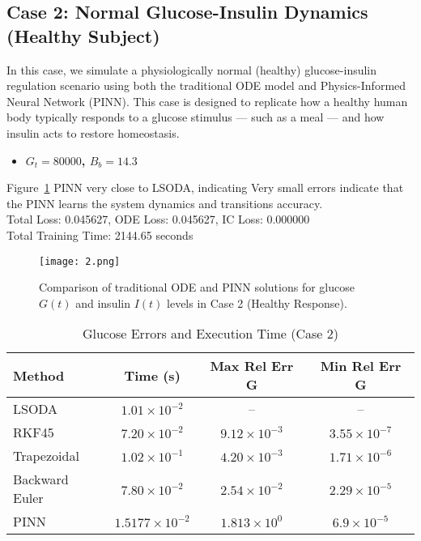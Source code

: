 \documentclass[conference]{IEEEtran}
\begin{document}
\subsection{Case 2: Normal Glucose-Insulin Dynamics (Healthy Subject)}

In this case, we simulate a physiologically normal (healthy) glucose-insulin regulation scenario using both the traditional ODE model and Physics-Informed Neural Network (PINN). This case is designed to replicate how a healthy human body typically responds to a glucose stimulus — such as a meal — and how insulin acts to restore homeostasis.
\vspace{0.3cm}
\begin{itemize}
\item \textbf{ $G_t = 80000$, $B_b = 14.3$} \\
\end{itemize}
Figure~\ref{fig:case2} PINN very close to LSODA, indicating
Very small errors indicate that the PINN learns the system dynamics and transitions accuracy.\\
Total Loss: 0.045627, ODE Loss: 0.045627, IC Loss: 0.000000\\
Total Training Time:   2144.65 seconds
\begin{figure}[htbp]
    \centering
    \texttt{[image: 2.png]}
    \caption{Comparison of traditional ODE and PINN solutions for glucose $G(t)$ and insulin $I(t)$ levels in Case 2 (Healthy Response).}
    \label{fig:case2}
\end{figure}
\vspace{-0.7cm}

\begin{table}[H]
\centering
\caption{Glucose Errors and Execution Time (Case 2)}
\begin{tabular}{|l|c|c|c|}
\hline
\textbf{Method} & \textbf{Time (s)} & \textbf{Max Rel Err G} & \textbf{Min Rel Err G} \\
\hline
LSODA & $1.01 \times 10^{-2}$ & -- & -- \\
RKF45 & $7.20 \times 10^{-2}$ & $9.12 \times 10^{-3}$ & $3.55 \times 10^{-7}$ \\
Trapezoidal & $1.02 \times 10^{-1}$ & $4.20 \times 10^{-3}$ & $1.71 \times 10^{-6}$ \\
Backward Euler & $7.80 \times 10^{-2}$ & $2.54 \times 10^{-2}$ & $2.29 \times 10^{-5}$ \\
PINN & $1.5177 \times 10^{-2}$ & $1.813 \times 10^{0}$ & $6.9 \times 10^{-5}$ \\
\hline
\end{tabular}
\end{table}
\vspace{-0.7cm}
\end{document}
